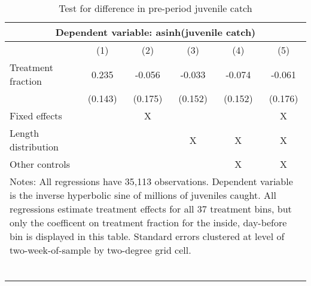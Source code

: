 \begin{table}[tb]
\centering
\caption{Test for difference in pre-period juvenile catch} 
\label{preperiod_juvenilecatch}
\begin{tabular}{lccccc}
   \toprule \multicolumn{6}{c}{Dependent variable: asinh(juvenile catch)} \\ \midrule  & (1) & (2) & (3) & (4) & (5) \\ 
    \midrule Treatment fraction & 0.235 & -0.056 & -0.033 & -0.074 & -0.061 \\ 
   & (0.143) & (0.175) & (0.152) & (0.152) & (0.176) \\ 
    \midrule Fixed effects & & X & & & X\\  Length distribution & & & X & X & X \\ Other controls & & & & X & X \\ \bottomrule \multicolumn{6}{l}{\multirow{2}{12cm}{Notes: All regressions have 35,113 observations. Dependent variable is the inverse hyperbolic sine of millions of juveniles caught. All regressions estimate treatment effects for all 37 treatment bins, but only the coefficent on treatment fraction for the inside, day-before bin is displayed in this table. Standard errors clustered at level of two-week-of-sample by two-degree grid cell.}} \\\\\\\\\\\\\\\\ \end{tabular}
\end{table}
